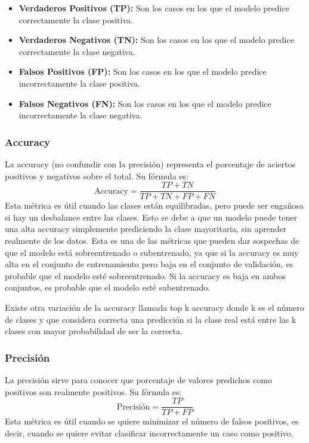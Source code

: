 \begin{itemize}
	\item \textbf{Verdaderos Positivos (TP):} Son los casos en los que el modelo predice correctamente la clase positiva.
	\item \textbf{Verdaderos Negativos (TN):} Son los casos en los que el modelo predice correctamente la clase negativa.
	\item \textbf{Falsos Positivos (FP):} Son los casos en los que el modelo predice incorrectamente la clase positiva.
	\item \textbf{Falsos Negativos (FN):} Son los casos en los que el modelo predice incorrectamente la clase negativa.
\end{itemize}

\subsubsection{Accuracy}

La accuracy (no confundir con la precisión) representa el porcentaje de aciertos positivos y negativos sobre el total.
Su fórmula es:
\begin{equation}
	\text{Accuracy} = \frac{TP + TN}{TP + TN + FP + FN}
\end{equation}
Esta métrica es útil cuando las clases están equilibradas, pero puede ser engañosa si hay un desbalance entre las clases.
Esto se debe a que un modelo puede tener una alta accuracy simplemente prediciendo la clase mayoritaria, sin aprender realmente de los datos.
Esta es una de las métricas que pueden dar sospechas de que el modelo está sobreentrenado o subentrenado, ya que si la accuracy es muy alta en el conjunto de entrenamiento pero baja en el conjunto de validación, es probable que el modelo esté sobreentrenado.
Si la accuracy es baja en ambos conjuntos, es probable que el modelo esté subentrenado.

Existe otra variación de la accuracy llamada top k accuracy donde k es el número de clases y que considera correcta una predicción si la clase real está entre las k clases con mayor probabilidad de ser la correcta.

\subsubsection{Precisión}

La precisión sirve para conocer que porcentaje de valores predichos como positivos son realmente positivos.
Su fórmula es:
\begin{equation}
	\text{Precisión} = \frac{TP}{TP + FP}
\end{equation}
Esta métrica es útil cuando se quiere minimizar el número de falsos positivos, es decir, cuando se quiere evitar clasificar incorrectamente un caso como positivo.


